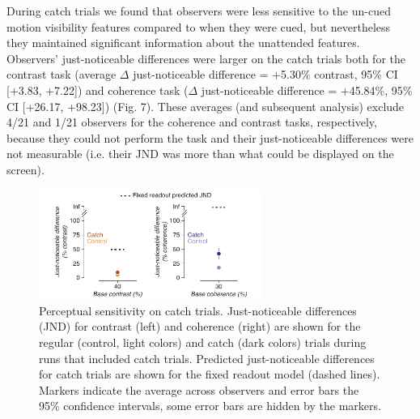 During catch trials we found that observers were less sensitive to the un-cued motion visibility features compared to when they were cued, but nevertheless they maintained significant information about the unattended features. Observers’ just-noticeable differences were larger on the catch trials both for the contrast task (average $\Delta$ just-noticeable difference = +5.30\% contrast, 95\% CI [+3.83, +7.22]) and coherence task ($\Delta$ just-noticeable difference = +45.84\%, 95\% CI [+26.17, +98.23]) (Fig. 7). These averages (and subsequent analysis) exclude 4/21 and 1/21 observers for the coherence and contrast tasks, respectively, because they could not perform the task and their just-noticeable differences were not measurable (i.e. their JND was more than what could be displayed on the screen). 

\begin{figure}
\centering
\includegraphics[keepaspectratio,width=0.65\textwidth]{figs_c3/Fig8_catch.pdf}
\caption[Perceptual sensitivity on catch trials]{Perceptual sensitivity on catch trials. Just-noticeable differences (JND) for contrast (left) and coherence (right) are shown for the regular (control, light colors) and catch (dark colors) trials during runs that included catch trials. Predicted just-noticeable differences for catch trials are shown for the fixed readout model (dashed lines). Markers indicate the average across observers and error bars the 95\% confidence intervals, some error bars are hidden by the markers. }
\label{fig:c3f8}
\end{figure}

